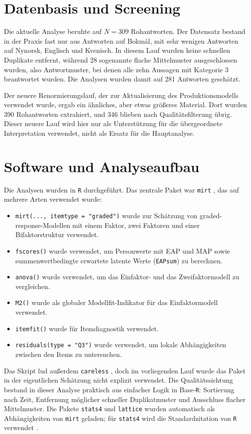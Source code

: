 \documentclass[11pt,a4paper]{article}
\begin{document}
\section{Datenbasis und Screening}
Die aktuelle Analyse beruhte auf $N = 309$ Rohantworten. Der Datensatz bestand in der Praxis fast nur aus Antworten auf Bokmål, mit sehr wenigen Antworten auf Nynorsk, Englisch und Kvenisch. In diesem Lauf wurden keine schnellen Duplikate entfernt, während 28 sogenannte flache Mittelmuster ausgeschlossen wurden, also Antwortmuster, bei denen alle zehn Aussagen mit Kategorie 3 beantwortet wurden. Die Analysen wurden damit auf 281 Antworten geschätzt.

Der neuere Renormierungslauf, der zur Aktualisierung des Produktionsmodells verwendet wurde, ergab ein ähnliches, aber etwas größeres Material. Dort wurden 390 Rohantworten extrahiert, und 346 blieben nach Qualitätsfilterung übrig. Dieser neuere Lauf wird hier nur als Unterstützung für die übergeordnete Interpretation verwendet, nicht als Ersatz für die Hauptanalyse.

\section{Software und Analyseaufbau}
Die Analysen wurden in \texttt{R} \parencite{RCore2026} durchgeführt. Das zentrale Paket war \texttt{mirt} \parencite{Chalmers2012mirt}, das auf mehrere Arten verwendet wurde:

\begin{itemize}
\item \texttt{mirt(..., itemtype = "graded")} wurde zur Schätzung von graded-response-Modellen mit einem Faktor, zwei Faktoren und einer Bifaktorstruktur verwendet.
\item \texttt{fscores()} wurde verwendet, um Personwerte mit EAP und MAP sowie summenwertbedingte erwartete latente Werte (\texttt{EAPsum}) zu berechnen.
\item \texttt{anova()} wurde verwendet, um das Einfaktor- und das Zweifaktormodell zu vergleichen.
\item \texttt{M2()} wurde als globaler Modellfit-Indikator für das Einfaktormodell verwendet.
\item \texttt{itemfit()} wurde für Itemdiagnostik verwendet.
\item \texttt{residuals(type = "Q3")} wurde verwendet, um lokale Abhängigkeiten zwischen den Items zu untersuchen.
\end{itemize}

Das Skript lud außerdem \texttt{careless} \parencite{YentesWilhelm2023careless}, doch im vorliegenden Lauf wurde das Paket in der eigentlichen Schätzung nicht explizit verwendet. Die Qualitätssichtung bestand in dieser Analyse praktisch aus einfacher Logik in Base-\texttt{R}: Sortierung nach Zeit, Entfernung möglicher schneller Duplikatmuster und Ausschluss flacher Mittelmuster. Die Pakete \texttt{stats4} und \texttt{lattice} \parencite{Sarkar2008lattice} wurden automatisch als Abhängigkeiten von \texttt{mirt} geladen; für \texttt{stats4} wird die Standardzitation von \texttt{R} verwendet \parencite{RCore2026}.
\end{document}

